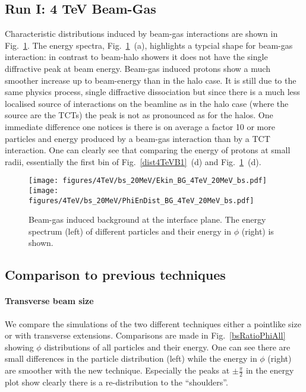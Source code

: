 \subsection{Run I: 4 TeV Beam-Gas}

Characteristic distributions induced by beam-gas interactions are shown in Fig.~\ref{dist4TeVBGbs}. The energy spectra, Fig.~\ref{dist4TeVBGbs}~(a), highlights a typcial shape for beam-gas interaction: in contrast to beam-halo showers it does not have the single diffractive peak at beam energy. Beam-gas induced protons show a much smoother increase up to beam-energy than in the halo case. It is still due to the same physics process, single diffractive dissociation but since there is a much less localised source of interactions on the beamline as in the halo case (where the source are the TCTs) the peak is not as pronounced as for the halos.
One immediate difference one notices is there is on average a factor 10 or more particles and energy produced by a beam-gas interaction than by a TCT interaction. One can clearly see that comparing the energy of protons at small radii, essentially the first bin of Fig.~\ref{dist4TeVB1}~(d) and Fig.~\ref{dist4TeVBGbs}~(d).


\begin{figure}%
\centering
\texttt{[image: figures/4TeV/bs\_20MeV/Ekin\_BG\_4TeV\_20MeV\_bs.pdf]}
\texttt{[image: figures/4TeV/bs\_20MeV/PhiEnDist\_BG\_4TeV\_20MeV\_bs.pdf]}
 \caption{Beam-gas induced background at the interface plane. The energy spectrum (left) of different particles and their energy in $\phi$ (right) is shown.
  \label{dist4TeVBGbs}}
\end{figure}
\subsection{Comparison to previous techniques}

\paragraph{Transverse beam size}
We compare the simulations of the two different techniques either a pointlike size or with transverse extensions. Comparisons are made in Fig.~\ref{bsRatioPhiAll} showing $\phi$ distributions of all particles and their energy. One can see there are small differences in the particle distribution (left) while the energy in $\phi$ (right) are smoother with the new technique. Especially the peaks at $\pm \frac{\pi}{2}$ in the energy plot show clearly there is a re-distribution to the ``shoulders''.

